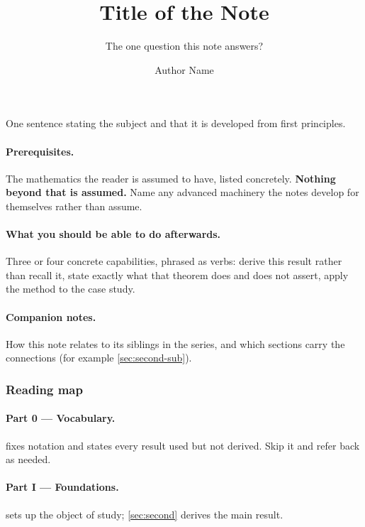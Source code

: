\documentclass{lecturenotes}
\title{Title of the Note}
\subtitle{The one question this note answers?}
\author{Author Name}
\begin{document}
\maketitle
\tableofcontents

One sentence stating the subject and that it is developed from first
principles.

\paragraph{Prerequisites.} The mathematics the reader is assumed to have,
listed concretely. \textbf{Nothing beyond that is assumed.} Name any
advanced machinery the notes develop for themselves rather than assume.

\paragraph{What you should be able to do afterwards.} Three or four concrete
capabilities, phrased as verbs: derive this result rather than recall it,
state exactly what that theorem does and does not assert, apply the method to
the case study.

\paragraph{Companion notes.} How this note relates to its siblings in the
series, and which sections carry the connections (for example
\cref{sec:second-sub}).

\separator

\subsubsection*{Reading map}

\paragraph{Part 0 --- Vocabulary.}  fixes notation and
states every result used but not derived. Skip it and refer back as needed.

\paragraph{Part I --- Foundations.}  sets up the object of
study; \cref{sec:second} derives the main result.
\end{document}
